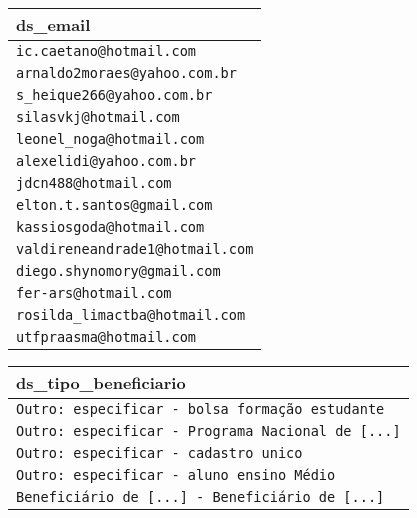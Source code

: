 

\begin{table}[h]
\small
\begin{minipage}{.4\linewidth}
\begin{tabular}{@{}l@{}}
\toprule
ds\_email                             \\ \midrule
\verb|ic.caetano@hotmail.com|        \\
\verb|arnaldo2moraes@yahoo.com.br|   \\
\verb|s_heique266@yahoo.com.br|      \\
\verb|silasvkj@hotmail.com|          \\
\verb|leonel_noga@hotmail.com|       \\
\verb|alexelidi@yahoo.com.br|        \\
\verb|jdcn488@hotmail.com|           \\
\verb|elton.t.santos@gmail.com|      \\
\verb|kassiosgoda@hotmail.com|       \\
\verb|valdireneandrade1@hotmail.com| \\
\verb|diego.shynomory@gmail.com|     \\
\verb|fer-ars@hotmail.com|           \\
\verb|rosilda_limactba@hotmail.com|  \\
\verb|utfpraasma@hotmail.com|        \\ \bottomrule
\end{tabular}
\end{minipage}%
\begin{minipage}{.6\linewidth}
\begin{tabular}{@{}l@{}}
\toprule
ds\_tipo\_beneficiario                                   \\ \midrule
\verb|Outro: especificar - bolsa formação estudante|     \\
\verb|Outro: especificar - Programa Nacional de [...]|   \\
\verb|Outro: especificar - cadastro unico|               \\
\verb|Outro: especificar - aluno ensino Médio|           \\
\verb|Beneficiário de [...] - Beneficiário de [...]|     \\

\end{tabular}
\end{minipage}
\end{table}
